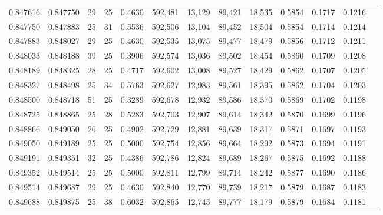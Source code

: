 \begin{tabular}{rrrrrrrrrrrrr}
0.847616 & 0.847750 &    29 &  25 &                                     0.4630 & 592,481 &  13,129 &  89,421 &  18,535 & 0.5854 & 0.1717 & 0.1216 \\
0.847750 & 0.847883 &    25 &  31 &                                     0.5536 & 592,506 &  13,104 &  89,452 &  18,504 & 0.5854 & 0.1714 & 0.1214 \\
0.847883 & 0.848027 &    29 &  25 &                                     0.4630 & 592,535 &  13,075 &  89,477 &  18,479 & 0.5856 & 0.1712 & 0.1211 \\
0.848033 & 0.848188 &    39 &  25 &                                     0.3906 & 592,574 &  13,036 &  89,502 &  18,454 & 0.5860 & 0.1709 & 0.1208 \\
0.848189 & 0.848325 &    28 &  25 &                                     0.4717 & 592,602 &  13,008 &  89,527 &  18,429 & 0.5862 & 0.1707 & 0.1205 \\
0.848327 & 0.848498 &    25 &  34 &                                     0.5763 & 592,627 &  12,983 &  89,561 &  18,395 & 0.5862 & 0.1704 & 0.1203 \\
0.848500 & 0.848718 &    51 &  25 &                                     0.3289 & 592,678 &  12,932 &  89,586 &  18,370 & 0.5869 & 0.1702 & 0.1198 \\
0.848725 & 0.848865 &    25 &  28 &                                     0.5283 & 592,703 &  12,907 &  89,614 &  18,342 & 0.5870 & 0.1699 & 0.1196 \\
0.848866 & 0.849050 &    26 &  25 &                                     0.4902 & 592,729 &  12,881 &  89,639 &  18,317 & 0.5871 & 0.1697 & 0.1193 \\
0.849050 & 0.849189 &    25 &  25 &                                     0.5000 & 592,754 &  12,856 &  89,664 &  18,292 & 0.5873 & 0.1694 & 0.1191 \\
0.849191 & 0.849351 &    32 &  25 &                                     0.4386 & 592,786 &  12,824 &  89,689 &  18,267 & 0.5875 & 0.1692 & 0.1188 \\
0.849352 & 0.849514 &    25 &  25 &                                     0.5000 & 592,811 &  12,799 &  89,714 &  18,242 & 0.5877 & 0.1690 & 0.1186 \\
0.849514 & 0.849687 &    29 &  25 &                                     0.4630 & 592,840 &  12,770 &  89,739 &  18,217 & 0.5879 & 0.1687 & 0.1183 \\
0.849688 & 0.849875 &    25 &  38 &                                     0.6032 & 592,865 &  12,745 &  89,777 &  18,179 & 0.5879 & 0.1684 & 0.1181 \\

\end{tabular}
